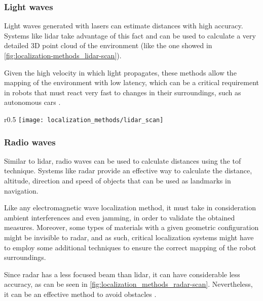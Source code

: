 \subsubsection{Light waves}

Light waves generated with lasers can estimate distances with high accuracy. Systems like \gls{lidar} take advantage of this fact and can be used to calculate a very detailed 3D point cloud of the environment (like the one showed in \cref{fig:localization-methods_lidar-scan}).

Given the high velocity in which light propagates, these methods allow the mapping of the environment with low latency, which can be a critical requirement in robots that must react very fast to changes in their surroundings, such as autonomous cars \cite{Moras2010}.

\begin{wrapfigure}{r}{0.5\textwidth}
	\centering
	\texttt{[image: localization\_methods/lidar\_scan]}
	\caption{ scan\protect\footnotemark}
	\label{fig:localization-methods_lidar-scan}
\end{wrapfigure}


\subsubsection{Radio waves}

Similar to \gls{lidar}, radio waves can be used to calculate distances using the \gls{tof} technique. Systems like \gls{radar} provide an effective way to calculate the distance, altitude, direction and speed of objects that can be used as landmarks in navigation.

Like any electromagnetic wave localization method, it must take in consideration ambient interferences and even jamming, in order to validate the obtained measures. Moreover, some types of materials with a given geometric configuration might be invisible to \gls{radar}, and as such, critical localization systems might have to employ some additional techniques to ensure the correct mapping of the robot surroundings.

Since \gls{radar} has a less focused beam than \gls{lidar}, it can have considerable less accuracy, as can be seen in \cref{fig:localization_methods_radar-scan}. Nevertheless, it can be an effective method to avoid obstacles \cite{Wu2007}.


